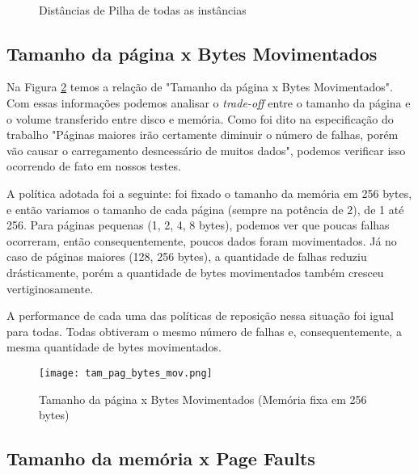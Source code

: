 \documentclass[12pt]{article}
\begin{document}
\begin{figure}
\centering
\mbox{\quad
{}}
\mbox{\quad
{}}
\caption{Distâncias de Pilha de todas as instâncias} \label{img_dist_pilha}
\end{figure}


\subsection{Tamanho da página x Bytes Movimentados}
\label{tam_pag_bytes_mov}

Na Figura \ref{tam_pag_bytes_mov} temos a relação de "Tamanho da página x Bytes Movimentados". Com essas informações podemos analisar o \textit{trade-off} entre o tamanho da página e o volume transferido entre disco e memória. Como foi dito na especificação do trabalho "Páginas maiores irão certamente diminuir o número de falhas, porém vão causar o carregamento desncessário de muitos dados", podemos verificar isso ocorrendo de fato em nossos testes.

A política adotada foi a seguinte: foi fixado o tamanho da memória em 256 bytes, e então variamos o tamanho de cada página (sempre na potência de 2), de 1 até 256. Para páginas pequenas (1, 2, 4, 8 bytes), podemos ver que poucas falhas ocorreram, então consequentemente, poucos dados foram movimentados. Já no caso de páginas maiores (128, 256 bytes), a quantidade de falhas reduziu drásticamente, porém a quantidade de bytes movimentados também cresceu vertiginosamente.

A performance de cada uma das políticas de reposição nessa situação foi igual para todas. Todas obtiveram o mesmo número de falhas e, consequentemente, a mesma quantidade de bytes movimentados.


   \begin{figure}
        \centering
        \texttt{[image: tam\_pag\_bytes\_mov.png]}
        \caption{Tamanho da página x Bytes Movimentados (Memória fixa em 256 bytes)}
        \label{tam_pag_bytes_mov}
    \end{figure}


\subsection{Tamanho da memória x Page Faults}
\label{tam_mem_page_faults}
\end{document}
